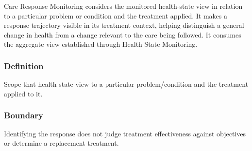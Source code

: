 Care Response Monitoring considers the monitored health-state view in relation to a particular problem or condition and the treatment applied. It makes a response trajectory visible in its treatment context, helping distinguish a general change in health from a change relevant to the care being followed. It consumes the aggregate view established through Health State Monitoring.

\subsubsection*{Definition}

Scope that health-state view to a particular problem/\allowbreak{}condition and the treatment applied to it.

\subsubsection*{Boundary}

Identifying the response does not judge treatment effectiveness against objectives or determine a replacement treatment.

